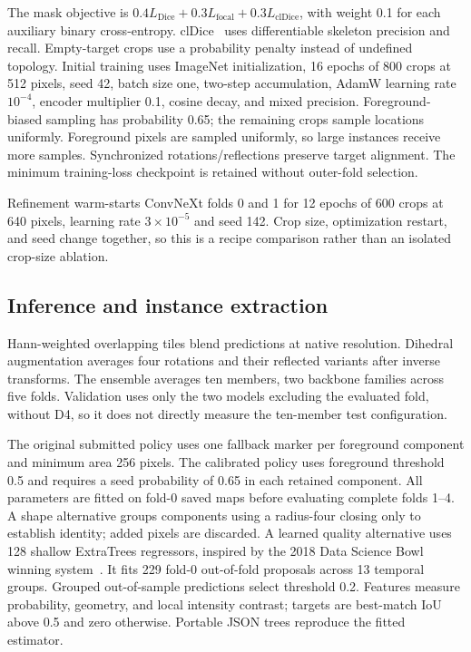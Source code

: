 \documentclass[sigconf]{acmart}
\begin{document}
The mask objective is $0.4L_{\mathrm{Dice}}+0.3L_{\mathrm{focal}}+0.3L_{\mathrm{clDice}}$, with weight 0.1 for each auxiliary binary cross-entropy. clDice~\cite{cldice} uses differentiable skeleton precision and recall. Empty-target crops use a probability penalty instead of undefined topology. Initial training uses ImageNet initialization, 16 epochs of 800 crops at 512 pixels, seed 42, batch size one, two-step accumulation, AdamW learning rate $10^{-4}$, encoder multiplier 0.1, cosine decay, and mixed precision. Foreground-biased sampling has probability 0.65; the remaining crops sample locations uniformly. Foreground pixels are sampled uniformly, so large instances receive more samples. Synchronized rotations/reflections preserve target alignment. The minimum training-loss checkpoint is retained without outer-fold selection.

Refinement warm-starts ConvNeXt folds 0 and 1 for 12 epochs of 600 crops at 640 pixels, learning rate $3\times10^{-5}$ and seed 142. Crop size, optimization restart, and seed change together, so this is a recipe comparison rather than an isolated crop-size ablation.

\subsection{Inference and instance extraction}
Hann-weighted overlapping tiles blend predictions at native resolution. Dihedral augmentation averages four rotations and their reflected variants after inverse transforms. The ensemble averages ten members, two backbone families across five folds. Validation uses only the two models excluding the evaluated fold, without D4, so it does not directly measure the ten-member test configuration.

The original submitted policy uses one fallback marker per foreground component and minimum area 256 pixels. The calibrated policy uses foreground threshold 0.5 and requires a seed probability of 0.65 in each retained component. All parameters are fitted on fold-0 saved maps before evaluating complete folds 1--4. A shape alternative groups components using a radius-four closing only to establish identity; added pixels are discarded. A learned quality alternative uses 128 shallow ExtraTrees regressors, inspired by the 2018 Data Science Bowl winning system~\cite{dsb}. It fits 229 fold-0 out-of-fold proposals across 13 temporal groups. Grouped out-of-sample predictions select threshold 0.2. Features measure probability, geometry, and local intensity contrast; targets are best-match IoU above 0.5 and zero otherwise. Portable JSON trees reproduce the fitted estimator.
\end{document}
